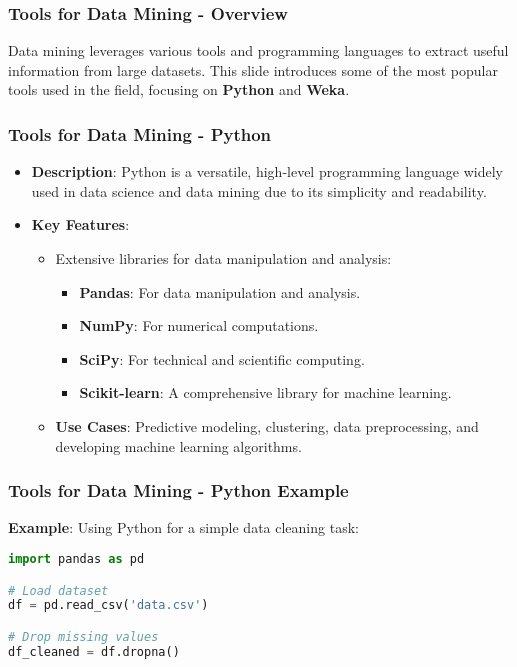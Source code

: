 \documentclass{beamer}
\begin{document}
\begin{frame}
    \frametitle{Tools for Data Mining - Overview}
    Data mining leverages various tools and programming languages to extract useful information from large datasets. This slide introduces some of the most popular tools used in the field, focusing on \textbf{Python} and \textbf{Weka}.
\end{frame}

\begin{frame}
    \frametitle{Tools for Data Mining - Python}
    \begin{itemize}
        \item \textbf{Description}: Python is a versatile, high-level programming language widely used in data science and data mining due to its simplicity and readability.
        \item \textbf{Key Features}:
            \begin{itemize}
                \item Extensive libraries for data manipulation and analysis:
                    \begin{itemize}
                        \item \textbf{Pandas}: For data manipulation and analysis.
                        \item \textbf{NumPy}: For numerical computations.
                        \item \textbf{SciPy}: For technical and scientific computing.
                        \item \textbf{Scikit-learn}: A comprehensive library for machine learning.
                    \end{itemize}
                \item \textbf{Use Cases}: Predictive modeling, clustering, data preprocessing, and developing machine learning algorithms.
            \end{itemize}
    \end{itemize}
\end{frame}

\begin{frame}[fragile]
    \frametitle{Tools for Data Mining - Python Example}
    \textbf{Example}: Using Python for a simple data cleaning task:
    \begin{lstlisting}[language=Python]
import pandas as pd

# Load dataset
df = pd.read_csv('data.csv')

# Drop missing values
df_cleaned = df.dropna()
    \end{lstlisting}
\end{frame}
\end{document}
